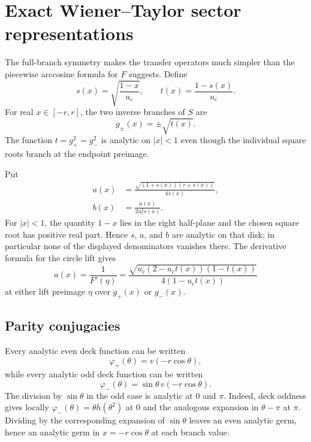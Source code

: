 \documentclass[11pt]{article}
\theoremstyle{definition}
\theoremstyle{remark}
\newcommand{\uc}{u_{\mathrm c}}
\begin{document}
\section{Exact Wiener--Taylor sector representations}
\label{sec:taylor-representation}

The full-branch symmetry makes the transfer operators much simpler than the
piecewise arccosine formula for $F$ suggests.  Define
\begin{equation}\label{eq:s-t}
 s(x)=\sqrt{\frac{1-x}{\uc}},
 \qquad
 t(x)=\frac{1-s(x)}{\uc}.
\end{equation}
For real $x\in[-r,r]$, the two inverse branches of $S$ are
\begin{equation}\label{eq:inverse-branches}
 g_\pm(x)=\pm\sqrt{t(x)}.
\end{equation}
The function $t=g_+^2=g_-^2$ is analytic on $|x|<1$ even though the
individual square roots branch at the endpoint preimage.

Put
\begin{align}
 a(x)
 &=\frac{\sqrt{(1+s(x))(r+s(x))}}{4s(x)},
 \label{eq:a-weight}\\
 b(x)
 &=\frac{a(x)}{2\uc^2s(x)}.
 \label{eq:b-weight}
\end{align}
For $|x|<1$, the quantity $1-x$ lies in the right half-plane and the chosen
square root has positive real part.  Hence $s$, $a$, and $b$ are analytic on
that disk; in particular none of the displayed denominators vanishes there.
The derivative formula for the circle lift gives
\begin{equation}\label{eq:a-derivative}
 a(x)=\frac1{F'(\eta)}
 =\frac{\sqrt{\uc(2-\uc t(x))(1-t(x))}}
 {4(1-\uc t(x))}
\end{equation}
at either lift preimage $\eta$ over $g_+(x)$ or $g_-(x)$.

\subsection{Parity conjugacies}

Every analytic even deck function can be written
\begin{equation}\label{eq:even-coordinate}
 \varphi_+(\theta)=v(-r\cos\theta),
\end{equation}
while every analytic odd deck function can be written
\begin{equation}\label{eq:odd-coordinate}
 \varphi_-(\theta)=\sin\theta\,v(-r\cos\theta).
\end{equation}
The division by $\sin\theta$ in the odd case is analytic at $0$ and $\pi$.
Indeed, deck oddness gives locally
$\varphi_-(\theta)=\theta h(\theta^2)$ at $0$ and the analogous expansion in
$\theta-\pi$ at $\pi$.  Dividing by the corresponding expansion of
$\sin\theta$ leaves an even analytic germ, hence an analytic germ in
$x=-r\cos\theta$ at each branch value.
\end{document}
